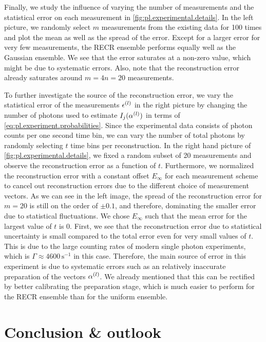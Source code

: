 Finally, we study the influence of varying the number of measurements and the statistical error on each measurement in \cref{fig:pl.experimental.details}.
In the left picture, we randomly select $m$ measurements from the existing data for 100 times and plot the mean as well as the spread of the error.
Except for a larger error for very few measurements, the RECR ensemble performs equally well as the Gaussian ensemble.
We see that the error saturates at a non-zero value, which might be due to systematic errors.
Also, note that the reconstruction error already saturates around $m = 4n = 20$ measurements.

To further investigate the source of the reconstruction error, we vary the statistical error of the measurements $\epsilon^{(l)}$ in the right picture by changing the number of photons used to estimate $I_j(\alpha^{(l)})$ in terms of \cref{eq:pl.experiment.probabilities}.
Since the experimental data consists of photon counts per one second time bin, we can vary the number of total photons by randomly selecting $t$ time bins per reconstruction.
In the right hand picture of \cref{fig:pl.experimental.details}, we fixed a random subset of 20 measurements and observe the reconstruction error as a function of $t$.
Furthermore, we normalized the reconstruction error with a constant offset $E_\infty$ for each measurement scheme to cancel out reconstruction errors due to the different choice of measurement vectors.
As we can see in the left image, the spread of the reconstruction error for $m=20$ is still on the order of $\pm 0.1$, and therefore, dominating the smaller error due to statistical fluctuations.
We chose $E_\infty$ such that the mean error for the largest value of $t$ is 0.
First, we see that the reconstruction error due to statistical uncertainty is small compared to the total error even for very small values of $t$.
This is due to the large counting rates of modern single photon experiments, which is $\Gamma \approx 4600\,\mathrm{s}^{-1}$ in this case.
Therefore, the main source of error in this experiment is due to systematic errors such as an relatively inaccurate preparation of the vectors $\alpha^{(l)}$.
We already mentioned that this can be rectified by better calibrating the preparation stage, which is much easier to perform for the RECR ensemble than for the uniform ensemble.


\section{Conclusion \& outlook}%
\label{sec:pl.final}

